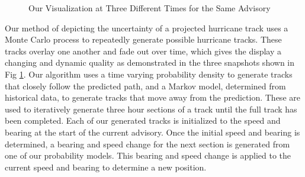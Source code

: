 \documentclass[journal]{vgtc}                %
\begin{document}
\begin{figure}[t]
 \centering
 \caption{Our Visualization at Three Different Times for the Same Advisory}
 \label{fig:visTS}
\end{figure}

Our method of depicting the uncertainty of a projected hurricane track uses a Monte Carlo process to repeatedly generate possible hurricane tracks.  These tracks overlay one another and fade out over time, which gives the display a changing and dynamic quality as demonstrated in the three snapshots shown in Fig \ref{fig:visTS}.  Our algorithm uses a time varying probability density to generate tracks that closely follow the predicted path, and a Markov model, determined from historical data, to generate tracks that move away from the prediction.  These are used to iteratively generate three hour sections of a track until the full track has been completed.  Each of our generated tracks is initialized to the speed and bearing at the start of the
current advisory. Once the initial speed and bearing is determined, a bearing and speed change for the next section is generated from one of our probability models.  This bearing and speed change is applied to the current speed and bearing to determine a new position.
\end{document}
